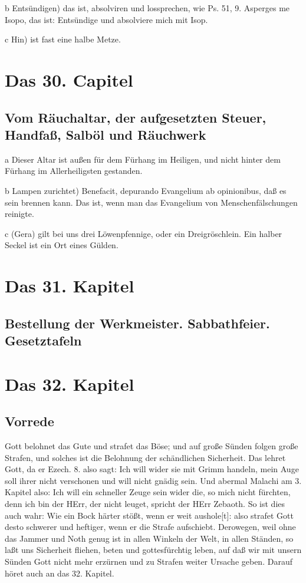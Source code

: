 b Entsündigen) das ist, absolviren und lossprechen, wie Ps. 51, 9. Asperges me Isopo, das ist: Entsündige und absolviere mich mit Isop.

c Hin) ist fast eine halbe Metze.

\chapter{Das 30. Capitel}

\section[Vom Räuchaltar, der aufgesetzten Steuer, Handfaß, Salböl und]{Vom Räuchaltar, der aufgesetzten Steuer, Handfaß, Salböl und Räuchwerk}

a Dieser Altar ist außen für dem Fürhang im Heiligen, und nicht hinter dem Fürhang im Allerheiligsten gestanden.

b Lampen zurichtet) Benefacit, depurando Evangelium ab opinionibus, daß es sein brennen kann. Das ist, wenn man das Evangelium von Menschenfälschungen reinigte.

c (Gera) gilt bei uns drei Löwenpfennige, oder ein Dreigröschlein. Ein halber Seckel ist ein Ort eines Gülden.

\chapter{Das 31. Kapitel}

\section{Bestellung der Werkmeister. Sabbathfeier. Gesetztafeln}

\chapter{Das 32. Kapitel}

\section{Vorrede}

Gott belohnet das Gute und strafet das Böse; und auf große Sünden folgen große Strafen, und solches ist die Belohnung der schändlichen Sicherheit. Das lehret Gott, da er Ezech. 8. also sagt: Ich will wider sie mit Grimm handeln, mein Auge soll ihrer nicht verschonen und will nicht gnädig sein. Und abermal Malachi am 3. Kapitel also: Ich will ein schneller Zeuge sein wider die, so mich nicht fürchten, denn ich bin der HErr, der nicht leuget, spricht der HErr Zebaoth. So ist dies auch wahr: Wie ein Bock härter stößt, wenn er weit aushole[t]: also strafet Gott desto schwerer und heftiger, wenn er die Strafe aufschiebt. Derowegen, weil ohne das Jammer und Noth genug ist in allen Winkeln der Welt, in allen Ständen, so laßt uns Sicherheit fliehen, beten und gottesfürchtig leben, auf daß wir mit unsern Sünden Gott nicht mehr erzürnen und zu Strafen weiter Ursache geben. Darauf höret auch an das 32. Kapitel.

